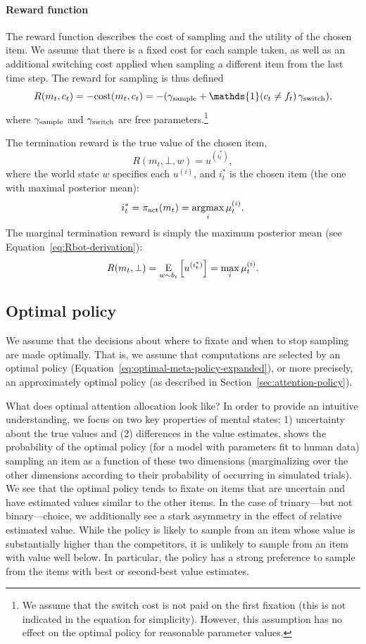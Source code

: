 \paragraph{Reward function}
The reward function describes the cost of sampling and the utility of the chosen item. We assume that there is a fixed cost for each sample taken, as well as an additional switching cost applied when sampling a different item from the last time step. The reward for sampling is thus defined
$$
R(m_t, c_t) = -\cost(m_t, c_t) = -(\samplecost + \mathds{1}(c_t \neq \last_t)\,\switchcost),
$$
where $\gamma_\text{sample}$ and $\gamma_\text{switch}$ are free parameters.\footnote{%
  We assume that the switch cost is not paid on the first fixation (this is not indicated in the equation for simplicity). However, this assumption has no effect on the optimal policy for reasonable parameter values.
}

The termination reward is the true value of the chosen item,
\begin{equation}
  R(m_t, \bot, w) = u^{(i^*_t)},
\end{equation}
where the world state $w$ specifies each $u^{(i)}$, and $i^*_t$ is the chosen item (the one with maximal posterior mean):
\begin{equation}
  i^*_t = \pi_{\text{act}}(m_t) =  \operatorname*{argmax}_i \mu_t^{(i)}.
\end{equation}
The marginal termination reward is simply the maximum posterior mean (see Equation~\ref{eq:Rbot-derivation}):
$$
R(m_t, \bot) = \operatorname*{E}_{w \sim b_t} \left[ u^{(i^*_t)}\right]
= \max_i \mu_t^{(i)}.
$$

\subsection{Optimal policy}

We assume that the decisions about where to fixate and when to stop sampling are made optimally. That is, we assume that computations are selected by an optimal policy (Equation~\ref{eq:optimal-meta-policy-expanded}), or more precisely, an approximately optimal policy (as described in Section~\ref{sec:attention-policy}).

What does optimal attention allocation look like? In order to provide an intuitive understanding, we focus on two key properties of mental states: 1) uncertainty about the true values and (2) differences in the value estimates.  shows the probability of the optimal policy (for a model with parameters fit to human data) sampling an item as a function of these two dimensions (marginalizing over the other dimensions according to their probability of occurring in simulated trials).
We see that the optimal policy tends to fixate on items that are uncertain and have estimated values similar to the other items.
In the case of trinary---but not binary---choice, we additionally see a stark asymmetry in the effect of relative estimated value. While the policy is likely to sample from an item whose value is substantially higher than the competitors, it is unlikely to sample from an item with value well below. In particular, the policy has a strong preference to sample from the items with best or second-best value estimates.

